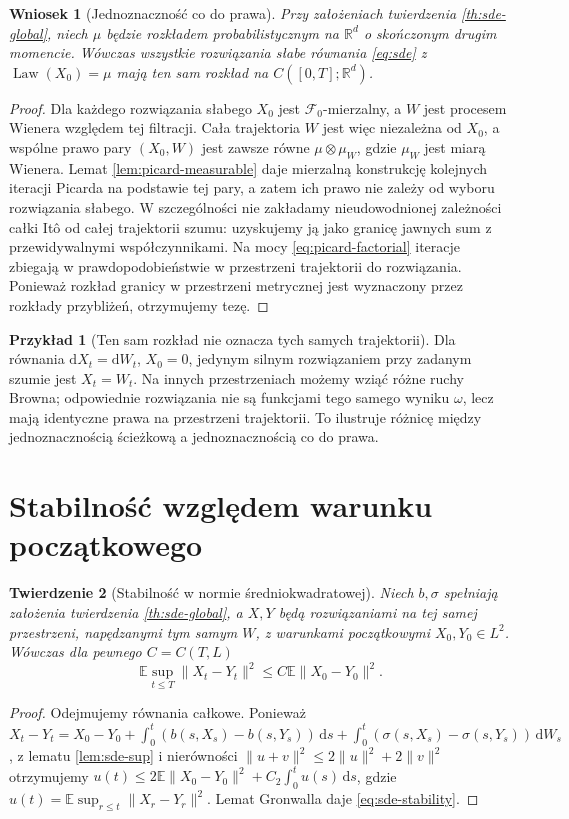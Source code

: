 \documentclass[11pt,a4paper,oneside]{report}
\numberwithin{equation}{chapter}
\theoremstyle{plain}
\newtheorem{twierdzenie}{Twierdzenie}[chapter]
\newtheorem{wniosek}[twierdzenie]{Wniosek}
\theoremstyle{definition}
\newtheorem{przyklad}{Przykład}[chapter]
\theoremstyle{remark}
\newcommand{\R}{\mathbb{R}}
\newcommand{\E}{\mathbb{E}}
\newcommand{\Law}{\operatorname{Law}}
\newcommand{\calF}{\mathcal{F}}
\newcommand{\dd}{\mathrm{d}}
\newcommand{\norm}[1]{\lVert #1\rVert}
\begin{document}
\begin{wniosek}[Jednoznaczność co do prawa]
\label{cor:sde-law}
Przy założeniach twierdzenia \ref{th:sde-global},
niech $\mu$ będzie rozkładem probabilistycznym
na $\R^d$ o skończonym drugim momencie.
Wówczas wszystkie rozwiązania słabe równania
\eqref{eq:sde} z $\Law(X_0)=\mu$ mają ten sam
rozkład na $C([0,T];\R^d)$.
\end{wniosek}
\begin{proof}
Dla każdego rozwiązania słabego $X_0$ jest
$\calF_0$-mierzalny, a $W$ jest procesem Wienera
względem tej filtracji. Cała trajektoria $W$
jest więc niezależna od $X_0$, a wspólne prawo pary
$(X_0,W)$ jest zawsze równe
$\mu\otimes\mu_W$, gdzie $\mu_W$ jest miarą Wienera.
Lemat \ref{lem:picard-measurable} daje mierzalną
konstrukcję kolejnych iteracji Picarda na podstawie
tej pary, a zatem ich prawo nie zależy od wyboru
rozwiązania słabego. W szczególności nie zakładamy
nieudowodnionej zależności całki Itô od całej trajektorii
szumu: uzyskujemy ją jako granicę jawnych sum
z przewidywalnymi współczynnikami. Na mocy
\eqref{eq:picard-factorial} iteracje zbiegają w
prawdopodobieństwie w przestrzeni trajektorii
do rozwiązania. Ponieważ rozkład granicy w
przestrzeni metrycznej jest wyznaczony przez rozkłady
przybliżeń, otrzymujemy tezę.
\end{proof}

\begin{przyklad}[Ten sam rozkład nie oznacza tych samych trajektorii]
Dla równania $\dd X_t=\dd W_t$, $X_0=0$,
jedynym silnym rozwiązaniem przy zadanym szumie jest
$X_t=W_t$. Na innych przestrzeniach możemy wziąć
różne ruchy Browna; odpowiednie rozwiązania nie są
funkcjami tego samego wyniku $\omega$, lecz mają
identyczne prawa na przestrzeni trajektorii.
To ilustruje różnicę między jednoznacznością ścieżkową
a jednoznacznością co do prawa.
\end{przyklad}

\section{Stabilność względem warunku początkowego}
\begin{twierdzenie}[Stabilność w normie średniokwadratowej]
\label{th:sde-stability}
Niech $b,\sigma$ spełniają założenia twierdzenia
\ref{th:sde-global}, a $X,Y$ będą rozwiązaniami
na tej samej przestrzeni, napędzanymi tym samym $W$,
z warunkami początkowymi $X_0,Y_0\in L^2$.
Wówczas dla pewnego $C=C(T,L)$
\[
\E\sup_{t\le T}\norm{X_t-Y_t}^2
\le C\E\norm{X_0-Y_0}^2.
\tag{5.6}\label{eq:sde-stability}
\]
\end{twierdzenie}
\begin{proof}
Odejmujemy równania całkowe. Ponieważ
$X_t-Y_t=X_0-Y_0+\int_0^t(b(s,X_s)-b(s,Y_s))\,\dd s
+\int_0^t(\sigma(s,X_s)-\sigma(s,Y_s))\,\dd W_s$,
z lematu \ref{lem:sde-sup} i nierówności
$\norm{u+v}^2\le2\norm u^2+2\norm v^2$
otrzymujemy
$u(t)\le2\E\norm{X_0-Y_0}^2+C_2\int_0^t u(s)\,\dd s$,
gdzie $u(t)=\E\sup_{r\le t}\norm{X_r-Y_r}^2$.
Lemat Gronwalla daje \eqref{eq:sde-stability}.
\end{proof}
\end{document}
